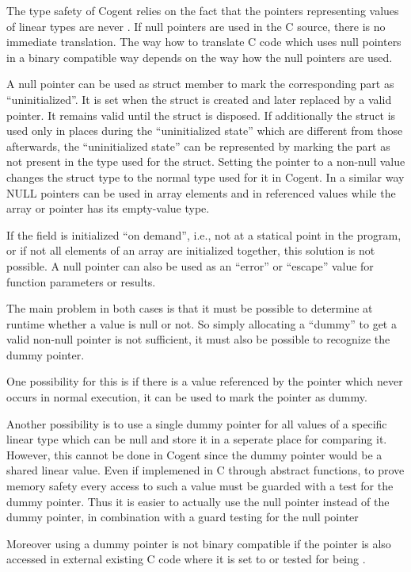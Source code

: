 The type safety of Cogent relies on the fact that the pointers representing values of linear types are never .
If null pointers are used in the C source, there is no immediate translation. The way how to translate C code which uses 
null pointers in a binary compatible way depends on the way how the null pointers are used.

A null pointer can be used as struct member  to mark the corresponding part as ``uninitialized''. 
It is set when the struct is created and later
replaced by a valid pointer. It remains valid until the struct is disposed. If additionally the struct is used only in places
during the ``uninitialized state'' which are different from those afterwards, the ``uninitialized state'' can be represented
by marking the part  as not present in the type used for the struct. Setting the pointer to a non-null value 
changes the struct type to the normal type used for it in Cogent. In a similar way NULL pointers can be used in array
elements and in referenced values while the array or pointer has its empty-value type.

If the field  is initialized ``on demand'', i.e., not at a statical point in the program, or if not all elements
of an array are initialized together, this solution is not possible.
A null pointer can also be used as an ``error'' or ``escape'' value for function parameters or results. 

The main problem in both cases is that it must be possible to determine at runtime whether a value is null or not. So simply
allocating a ``dummy'' to get a valid non-null pointer is not sufficient, it must also be possible to recognize the dummy pointer.

One possibility for this is if there is a value referenced by the pointer which never occurs in normal execution,
it can be used to mark the pointer as dummy. 

Another possibility is to use a single dummy pointer for all values of a specific linear type which can be null and store it 
in a seperate place for comparing it. However, this cannot be done in Cogent since the dummy pointer would be a shared linear 
value. Even if implemened in C through abstract functions, to prove memory safety every access to such a value must 
be guarded with a test for the dummy pointer. Thus it is easier to actually use the null pointer instead of the dummy pointer,
in combination with a guard testing for the null pointer

Moreover using a dummy pointer is not binary compatible if the pointer is 
also accessed in external existing C code where it is set to  or tested for being .

